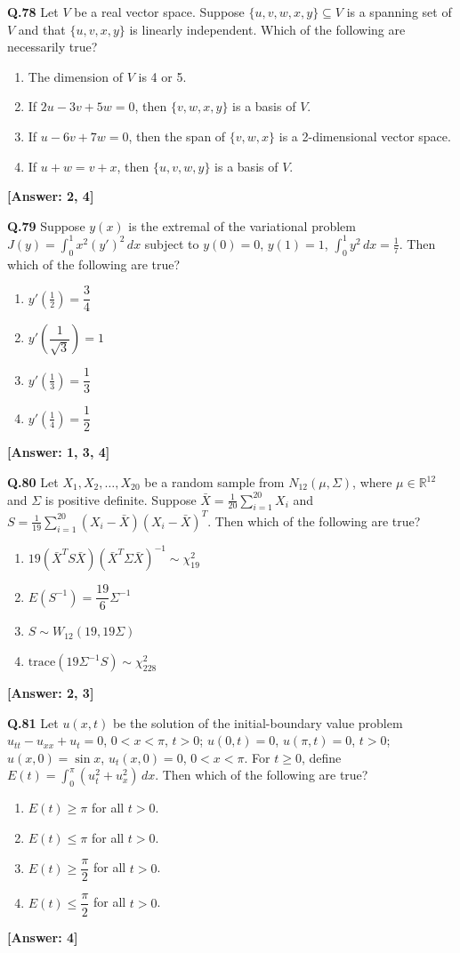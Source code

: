 \documentclass[12pt,a4paper]{article}
\newcommand{\ans}[1]{\quad\textcolor{anscolor}{\textbf{[Answer: #1]}}}
\begin{document}
\textbf{Q.78} Let $V$ be a real vector space. Suppose $\{u,v,w,x,y\}\subseteq V$ is a spanning set of $V$ and that $\{u,v,x,y\}$ is linearly independent. Which of the following are necessarily true?
\begin{enumerate}[label=\arabic*.]
\item The dimension of $V$ is 4 or 5.
\item If $2u-3v+5w=0$, then $\{v,w,x,y\}$ is a basis of $V$.
\item If $u-6v+7w=0$, then the span of $\{v,w,x\}$ is a 2-dimensional vector space.
\item If $u+w=v+x$, then $\{u,v,w,y\}$ is a basis of $V$.
\end{enumerate}\ans{2, 4}

\textbf{Q.79} Suppose $y(x)$ is the extremal of the variational problem $J(y)=\int_0^1x^2(y')^2\,dx$ subject to $y(0)=0$, $y(1)=1$, $\int_0^1y^2\,dx=\tfrac{1}{7}$. Then which of the following are true?
\begin{enumerate}[label=\arabic*.]
\item $y'\!\left(\tfrac{1}{2}\right)=\dfrac{3}{4}$
\item $y'\!\left(\dfrac{1}{\sqrt{3}}\right)=1$
\item $y'\!\left(\tfrac{1}{3}\right)=\dfrac{1}{3}$
\item $y'\!\left(\tfrac{1}{4}\right)=\dfrac{1}{2}$
\end{enumerate}\ans{1, 3, 4}

\textbf{Q.80} Let $X_1,X_2,\ldots,X_{20}$ be a random sample from $N_{12}(\mu,\Sigma)$, where $\mu\in\mathbb{R}^{12}$ and $\Sigma$ is positive definite. Suppose $\bar{X}=\tfrac{1}{20}\sum_{i=1}^{20}X_i$ and $S=\tfrac{1}{19}\sum_{i=1}^{20}(X_i-\bar{X})(X_i-\bar{X})^T$. Then which of the following are true?
\begin{enumerate}[label=\arabic*.]
\item $19(\bar{X}^TS\bar{X})(\bar{X}^T\Sigma\bar{X})^{-1}\sim\chi^2_{19}$
\item $E(S^{-1})=\dfrac{19}{6}\Sigma^{-1}$
\item $S\sim W_{12}(19,19\Sigma)$
\item $\text{trace}(19\Sigma^{-1}S)\sim\chi^2_{228}$
\end{enumerate}\ans{2, 3}

\textbf{Q.81} Let $u(x,t)$ be the solution of the initial-boundary value problem $u_{tt}-u_{xx}+u_t=0$, $0<x<\pi$, $t>0$; $u(0,t)=0$, $u(\pi,t)=0$, $t>0$; $u(x,0)=\sin x$, $u_t(x,0)=0$, $0<x<\pi$. For $t\ge0$, define $E(t)=\int_0^\pi(u_t^2+u_x^2)\,dx$. Then which of the following are true?
\begin{enumerate}[label=\arabic*.]
\item $E(t)\ge\pi$ for all $t>0$. \item $E(t)\le\pi$ for all $t>0$.
\item $E(t)\ge\dfrac{\pi}{2}$ for all $t>0$. \item $E(t)\le\dfrac{\pi}{2}$ for all $t>0$.
\end{enumerate}\ans{4}
\end{document}
